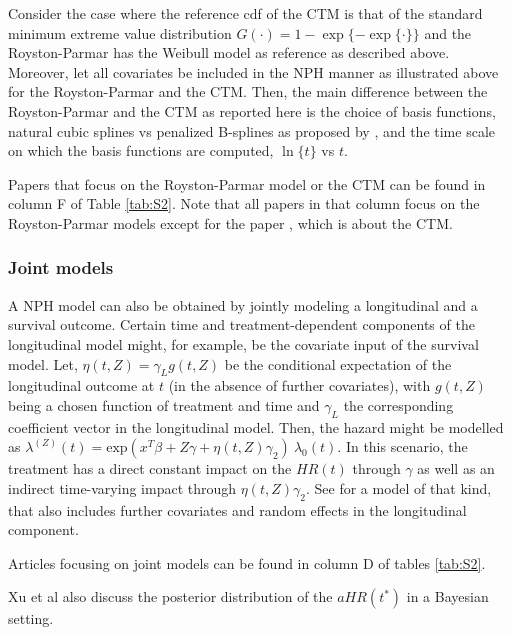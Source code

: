 \noindent Consider the case where the reference cdf of the CTM is that of the standard minimum extreme value distribution $G(\cdot)=1-\exp\{-\exp\{\cdot\}\}$ and the Royston-Parmar has the Weibull model as reference as described above.
Moreover, let all covariates be included in the NPH manner as illustrated above for the Royston-Parmar and the CTM.
Then, the main difference between the Royston-Parmar and the CTM as reported here is the choice of basis functions, natural cubic splines vs penalized B-splines as proposed by \cite{Most.2015}, and the time scale on which the basis functions are computed, $\ln\{t\}$ vs $t$.

\noindent Papers that focus on the Royston-Parmar model or the CTM can be found in column F of Table \ref{tab:S2}.
Note that all papers in that column focus on the Royston-Parmar models except for the paper \cite{Most.2015}, which is about the CTM.


\subsubsection{Joint models} \label{joint}

\noindent 


\noindent A NPH model can also be obtained by jointly modeling a longitudinal and a survival outcome. Certain time and treatment-dependent components of the longitudinal model might, for example, be the covariate input of the survival model. Let, $\eta (t,Z)={\gamma }_Lg(t,Z)$ be the conditional expectation of the longitudinal outcome at $t$ (in the absence of further covariates), with $g(t,Z)$ being a chosen function of treatment and time and ${\gamma }_L$ the corresponding coefficient vector in the longitudinal model. Then, the hazard might be modelled as ${\lambda }^{\left(Z\right)}\left(t\right)={\mathrm{ex}\mathrm{p} \left(x^T\beta +Z\gamma +\eta (t,Z){\gamma }_2\right)\ }{\lambda }_0(t)$. 
In this scenario, the treatment has a direct constant impact on the $HR(t)$ through $\gamma$ as well as an indirect time-varying impact through $\eta (t,Z){\gamma }_2$. 
See \cite{Xu.2022} for a model of that kind, that also includes further covariates and random effects in the longitudinal component.

\noindent Articles focusing on joint models can be found in column D of tables \ref{tab:S2}.

\noindent Xu et al \cite{Xu.2022} also discuss the posterior distribution of the $aHR(t^*)$ in a Bayesian setting.

